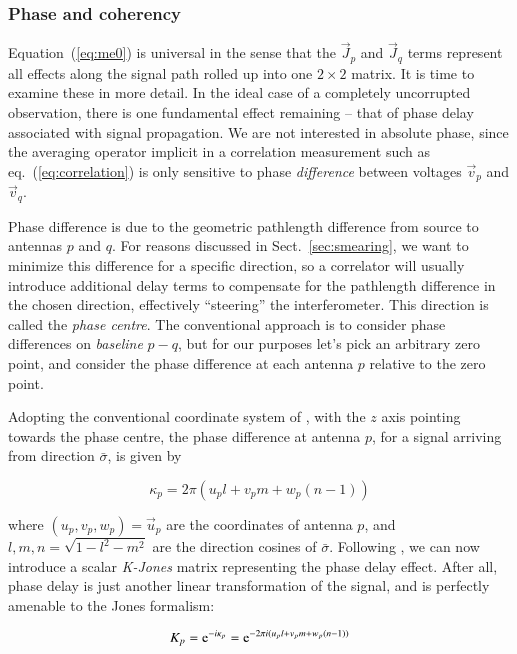 \documentclass[]{aa}
\begin{document}
\subsubsection{\label{sec:coherency}Phase and coherency}

Equation~(\ref{eq:me0}) is universal in the sense that the $\vec J_p$ and $\vec J_q$ terms represent all effects along the signal path rolled up into one $2\times2$ matrix. It is time to examine these in more detail. In the ideal case of a completely uncorrupted observation, there is one fundamental effect remaining -- that of phase delay associated with signal propagation. We are not interested in absolute phase, since the averaging operator implicit in a correlation measurement such as eq.~(\ref{eq:correlation}) is only sensitive to phase {\em difference} between voltages $\vec v_p$ and $\vec v_q$. 

Phase difference is due to the geometric pathlength difference from source to antennas $p$ and $q$. For reasons discussed in Sect.~\ref{sec:smearing}, we want to minimize this difference for a specific direction, so a correlator will usually introduce additional delay terms to compensate for the pathlength difference in the chosen direction, effectively ``steering'' the interferometer. This direction is called the {\em phase centre}. The conventional approach is to consider phase differences on {\em baseline} $p-q$, but for our purposes let's pick an arbitrary zero point, and consider the phase difference at each antenna $p$ relative to the zero point.

Adopting the conventional coordinate system of \citet{tms}, with the $z$ axis pointing towards the phase centre, the phase difference at antenna $p$, for a signal arriving from direction $\bar \sigma$, is given by

  \[
  \kappa_p = 2\pi (u_p l+v_p m+w_p (n-1))
  \]

where $(u_p,v_p,w_p)=\vec u_p$ are the coordinates of antenna $p$, and $l,m,n=\sqrt{1-l^2-m^2}$ are the direction cosines of $\bar\sigma$. Following \citet{JEN:note185}, we can now introduce a scalar {\em K-Jones} matrix representing the phase delay effect. After all, phase delay is just another linear transformation of the signal, and is perfectly amenable to the Jones formalism:

  \begin{equation}\label{eq:K}
  K_p = {\rm e}^{-i\kappa_p} = {\rm e}^{-2\pi i(u_p l+v_p m+w_p (n-1))}
  \end{equation}
\end{document}
